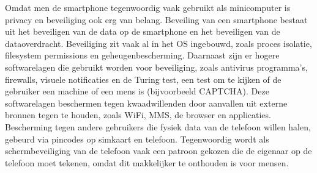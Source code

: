 Omdat men de smartphone tegenwoordig vaak gebruikt als minicomputer is privacy en beveiliging ook erg van belang. Beveiling van een smartphone bestaat uit het beveiligen van de data op de smartphone en het beveiligen van de dataoverdracht. Beveiliging zit vaak al in het OS ingebouwd, zoals proces isolatie, filesystem permissions en geheugenbescherming. Daarnaast zijn er hogere softwarelagen die gebruikt worden voor beveiliging, zoals antivirus programma’s, firewalls, visuele notificaties en de Turing test, een test om te kijken of de gebruiker een machine of een mens is (bijvoorbeeld CAPTCHA). Deze softwarelagen beschermen tegen kwaadwillenden door aanvallen uit externe bronnen tegen te houden, zoals WiFi, MMS, de browser en applicaties. Bescherming tegen andere gebruikers die fysiek data van de telefoon willen halen, gebeurd via pincodes op simkaart en telefoon. Tegenwoordig wordt als schermbeveiliging van de telefoon vaak een patroon gekozen die de eigenaar op de telefoon moet tekenen, omdat dit makkelijker te onthouden is voor mensen.

